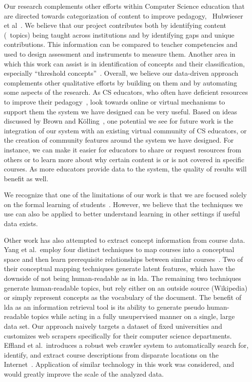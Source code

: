 Our research complements other efforts within Computer Science education that are directed towards categorization of content to improve pedagogy, \eg\ Hubwieser et al~\cite{hubwieser2013}.
We believe that our project contributes both by identifying content (\ie\ topics) being taught across institutions and by identifying gaps and unique contributions.
This information can be compared to teacher competencies and used to design assessment and instruments to measure them.
Another area in which this work can assist is in identification of concepts and their classification, especially ``threshold concepts''~\cite{ShinnersKennedyFincher2013}.
Overall, we believe our data-driven approach complements other qualitative efforts by building on them and by automating some aspects of the research.
As CS educators, who often have deficient resources to improve their pedagogy~\cite{Brown2013}, look towards online or virtual mechanisms to support them the system we have designed can be very useful.
Based on ideas discussed by Brown and K\"{o}lling~\cite{Brown2013}, one potential we see for future work is the integration of our system with an existing virtual community of CS educators, or the creation of community features around the system we have designed.
For instance, we can make it easier for educators to share or request resources from others or to learn more about why certain content is or is not covered in specific courses.
As more educators provide data to the system, the quality of results will benefit as well.


We recognize that one of the limitations of our work is that we are focused solely on the formal learning of students~\cite{Boustedt2011}.
However, we believe that the techniques we use can also be applied to better understand learning in other settings if useful data exists.


Other work has also attempted to extract concept information from course data.
Yang et al.\ employ four distinct techniques to map courses into a conceptual space and then learn prerequisite relationships between similar courses~\cite{Yang2015}.
Two of their conceptual mapping techniques generate latent features, which have the downside of not being human-readable as in \ac{lda}.
The remaining two techniques generate human-readable topics, but rely either on an outside source (Wikipedia) or simply represent concepts as the vocabulary of the document.
The benefit of \ac{lda} as an information retrieval tool is its ability to generate pseudo human-readable topics while acting in a fully unsupervised manner on a single, large data set.
Our approach naively targets a dataset of fixed universities and customizes web scrapers specifically for their computer science departments.
Effland et al.\ introduces a robust web crawler system to automatically search for, identify, and extract course descriptions from disparate locations on the Internet~\cite{Effland2015}.
Application of similar technology in this work was considered, and would greatly improve the scale of the analyzed data.



